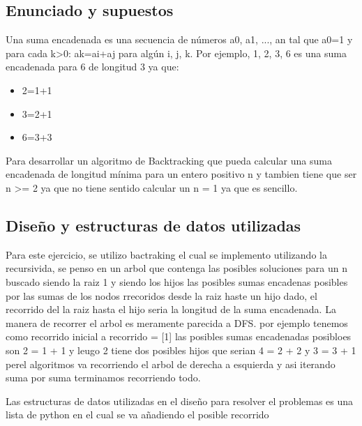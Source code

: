 \documentclass[a4paper, 12pt]{article}
\begin{document}
\subsection{Enunciado y supuestos}

Una suma encadenada es una secuencia de números a0, a1, ..., an tal que a0=1 y para cada k>0: ak=ai+aj para algún i, j, k. Por ejemplo, 1, 2, 3, 6 es una suma encadenada para 6 de longitud 3 ya que:

\begin{itemize}
	\item 2=1+1
	\item 3=2+1
	\item 6=3+3
\end{itemize}

\indent Para desarrollar un algoritmo de Backtracking que pueda calcular una suma encadenada de longitud mínima para un entero positivo n y tambien tiene que ser n >= 2 ya que no tiene sentido calcular un n = 1 ya que es sencillo.

\subsection{Diseño y estructuras de datos utilizadas}
Para este ejercicio, se utilizo bactraking el cual se implemento utilizando la recursivida, se penso en un arbol que contenga las posibles soluciones para un n buscado siendo la raiz 1 y siendo los hijos las posibles sumas encadenas posibles por las sumas de los nodos  rrecoridos desde la raiz haste un hijo dado, el recorrido del la raiz hasta el hijo seria la longitud de la suma encadenada. La manera de recorrer el arbol es meramente parecida a DFS.
    por ejemplo tenemos como recorrido inicial a recorrido = [1] las posibles sumas encadenadas posibloes son 2  = 1 + 1 y leugo 2 tiene dos posibles hijos que serian 4 = 2 + 2 y 3 = 3 + 1 perel algoritmos va recorriendo el arbol de derecha a esquierda y asi iterando suma por suma terminamos recorriendo todo.
\newline

    Las estructuras de datos utilizadas en el diseño para resolver el problemas es una lista de python en el cual se va añadiendo el posible recorrido
\end{document}
